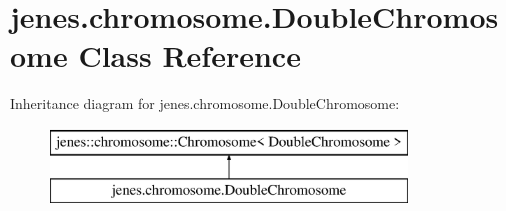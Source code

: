 \hypertarget{classjenes_1_1chromosome_1_1_double_chromosome}{\section{jenes.\-chromosome.\-Double\-Chromosome Class Reference}
\label{classjenes_1_1chromosome_1_1_double_chromosome}
}
Inheritance diagram for jenes.\-chromosome.\-Double\-Chromosome\-:\begin{figure}[H]
\begin{center}
\leavevmode
\includegraphics[height=2.000000cm]{classjenes_1_1chromosome_1_1_double_chromosome}
\end{center}
\end{figure}

